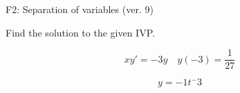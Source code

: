 \begin{exercise}
  \begin{exerciseTitle}F2: Separation of variables (ver. 9)\end{exerciseTitle}
  \begin{exerciseStatement}
    
Find the solution to the given IVP.

    
\[xy'= -3 y \hspace{1em} y( -3 ) = \frac{1}{27}\]

  \end{exerciseStatement}
  \begin{exerciseAnswer}
    
\[y= -1 t^ -3\]

  \end{exerciseAnswer}
\end{exercise}